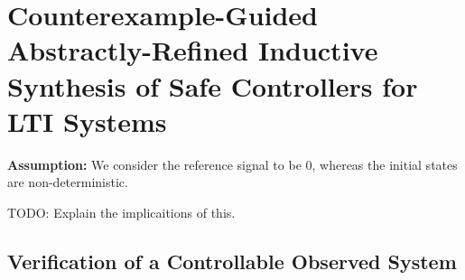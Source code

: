 \documentclass[runningheads,a4paper]{llncs}
\newcommand{\todo}[1]{{\color{red} TODO: #1}}
\begin{document}



\section{Counterexample-Guided Abstractly-Refined Inductive Synthesis of Safe Controllers for LTI Systems} 
\label{sec:CEGARIS} 

{\bf Assumption:} We consider the reference signal to be 0, whereas the initial states are non-deterministic.

\todo{Explain the implicaitions of this.}

\subsection{Verification of a Controllable Observed System}
\label{sec:cof_verification}
\end{document}
